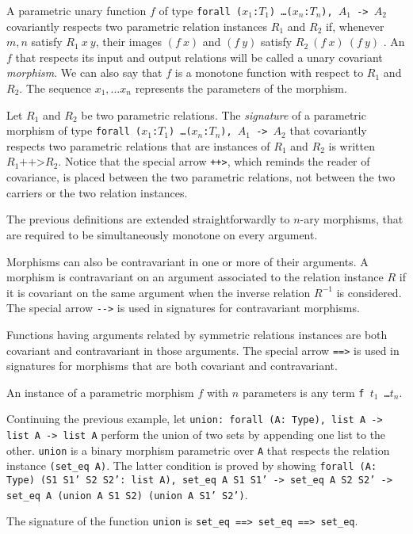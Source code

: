 A parametric unary function $f$ of type
\texttt{forall ($x_1$:$T_1$) \ldots ($x_n$:$T_n$), $A_1$ -> $A_2$}
covariantly respects two parametric relation instances $R_1$ and $R_2$ if,
whenever $m, n$ satisfy $R_1~x~y$, their images $(f~x)$ and $(f~y)$ 
satisfy $R_2~(f~x)~(f~y)$ . An $f$ that respects its input and output relations
will be called a unary covariant \emph{morphism}. We can also say that $f$ is
a monotone function with respect to $R_1$ and $R_2$. The sequence $x_1,\ldots x_n$ represents the parameters of the morphism.

Let $R_1$ and $R_2$ be two parametric relations.
The \emph{signature} of a parametric morphism of type
\texttt{forall ($x_1$:$T_1$) \ldots ($x_n$:$T_n$), $A_1$ -> $A_2$} that
covariantly respects two parametric relations that are instances of
$R_1$ and $R_2$ is written $R_1 \texttt{++>} R_2$.
Notice that the special arrow \texttt{++>}, which reminds the reader
of covariance, is placed between the two parametric relations, not
between the two carriers or the two relation instances.

The previous definitions are extended straightforwardly to $n$-ary morphisms,
that are required to be simultaneously monotone on every argument.

Morphisms can also be contravariant in one or more of their arguments.
A morphism is contravariant on an argument associated to the relation instance
$R$ if it is covariant on the same argument when the inverse relation
$R^{-1}$ is considered. The special arrow \texttt{-{}->} is used in signatures
for contravariant morphisms.

Functions having arguments related by symmetric relations instances are both
covariant and contravariant in those arguments. The special arrow
\texttt{==>} is used in signatures for morphisms that are both covariant
and contravariant.

An instance of a parametric morphism $f$ with $n$ parameters is any term
\texttt{f $t_1$ \ldots $t_n$}.

\begin{cscexample}[Morphisms]
Continuing the previous example, let
\texttt{union: forall (A: Type), list A -> list A -> list A} perform the union
of two sets by appending one list to the other. \texttt{union} is a binary
morphism parametric over \texttt{A} that respects the relation instance
\texttt{(set\_eq A)}. The latter condition is proved by showing
\texttt{forall (A: Type) (S1 S1' S2 S2': list A), set\_eq A S1 S1' ->
 set\_eq A S2 S2' -> set\_eq A (union A S1 S2) (union A S1' S2')}.

The signature of the function \texttt{union} is
\texttt{set\_eq ==> set\_eq ==> set\_eq}.
\end{cscexample}

